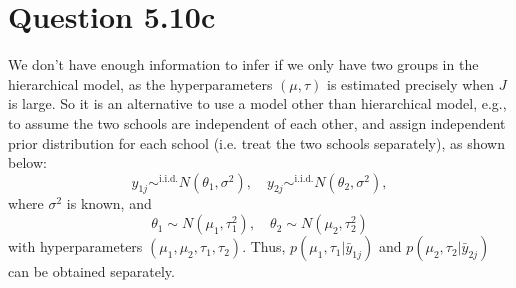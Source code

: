\documentclass{article}
\begin{document}
\section*{Question 5.10c}
{
    We don't have enough information to infer if we only have two groups in the hierarchical model, as the hyperparameters $(\mu, \tau)$ is estimated precisely when $J$ is large. So it is an alternative to use a model other than hierarchical model, e.g., to assume the two schools are independent of each other, and assign independent prior distribution for each school (i.e. treat the two schools separately), as shown below:
    $$y_{1j} \sim^{\mathrm{i.i.d.}} N(\theta_1, \sigma^2), \quad y_{2j} \sim^{\mathrm{i.i.d.}} N(\theta_2, \sigma^2),$$
    where $\sigma^2$ is known, and $$\theta_1 \sim N(\mu_1, \tau_1^2), \quad \theta_2 \sim N(\mu_2, \tau_2^2)$$ with hyperparameters $(\mu_1, \mu_2, \tau_1, \tau_2)$. Thus, $p(\mu_1, \tau_1 | \bar{y}_{1j})$ and $p(\mu_2, \tau_2 | \bar{y}_{2j})$ can be obtained separately.

}
\end{document}
